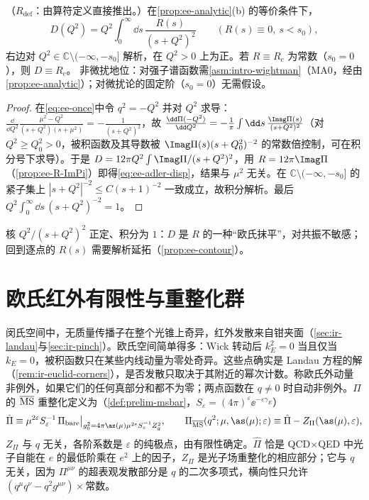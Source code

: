 \begin{proposition}\label{prop:ee-adler-dispersion}
（$R_{\mathrm{def}}$：由算符定义直接推出。）在\cref{prop:ee-analytic}(b) 的等价条件下，
\begin{equation}\label{eq:ee-adler-disp}
D(Q^2)=Q^2\int_0^\infty\!\dd s\,\frac{R(s)}{(s+Q^2)^2}\qquad(R(s)\equiv0,\ s<s_0),
\end{equation}
右边对 $Q^2\in\mathbb C\setminus(-\infty,-s_0]$ 解析，在 $Q^2>0$ 上为正。若 $R\equiv R_c$ 为常数（$s_0=0$），则 $D\equiv R_c$。
非微扰地位：对强子谱函数需\cref{asm:intro-wightman}（MA0，经由\cref{prop:ee-analytic}）；对微扰论的固定阶（$s_0=0$）无需假设。
\end{proposition}
\begin{proof}
在\cref{eq:ee-once}中令 $q^2=-Q^2$ 并对 $Q^2$ 求导：$\frac{\dd}{\dd Q^2}\frac{\mu^2-Q^2}{(s+Q^2)(s+\mu^2)}=-\frac{1}{(s+Q^2)^2}$，故 $\frac{\dd\Pi(-Q^2)}{\dd Q^2}=-\frac1\pi\int\dd s\,\frac{\Imag\Pi(s)}{(s+Q^2)^2}$（对 $Q^2\ge Q_0^2>0$，被积函数及其导数被 $\Imag\Pi(s)(s+Q_0^2)^{-2}$ 的常数倍控制，可在积分号下求导）。于是 $D=12\pi Q^2\int\Imag\Pi/(s+Q^2)^2$，用 $R=12\pi\Imag\Pi$（\cref{prop:ee-R-ImPi}）即得\cref{eq:ee-adler-disp}，结果与 $\mu^2$ 无关。在 $\mathbb C\setminus(-\infty,-s_0]$ 的紧子集上 $|s+Q^2|^{-2}\le C(s+1)^{-2}$ 一致成立，故积分解析。最后 $Q^2\int_0^\infty\dd s\,(s+Q^2)^{-2}=1$。
\end{proof}
核 $Q^2/(s+Q^2)^2$ 正定、积分为 $1$：$D$ 是 $R$ 的一种“欧氏抹平”，对共振不敏感；回到逐点的 $R(s)$ 需要解析延拓（\cref{prop:ee-contour}）。

\section{欧氏红外有限性与重整化群}\label{sec:ee-euclid}

闵氏空间中，无质量传播子在整个光锥上奇异，红外发散来自钳夹面（\cref{sec:ir-landau}与\cref{sec:ir-pinch}）。欧氏空间简单得多：Wick 转动后 $k_E^2=0$ 当且仅当 $k_E=0$，被积函数只在某些内线动量为零处奇异。这些点确实是 Landau 方程的解（\cref{rem:ir-euclid-corners}），是否发散只取决于其附近的幂次计数。称欧氏外动量非例外，如果它们的任何真部分和都不为零；两点函数在 $q\ne0$ 时自动非例外。$\Pi$ 的 $\overline{\rm MS}$ 重整化定义为（\cref{def:prelim-msbar}，$S_\varepsilon=(4\pi)^\varepsilon\ee^{-\varepsilon\gamma_E}$）
\begin{equation}\label{eq:ee-PiMS}
\hat\Pi\equiv\mu^{2\varepsilon}S_\varepsilon^{-1}\,\Pi_{\rm bare}\big|_{g_0^2=4\pi\as(\mu)\mu^{2\varepsilon}S_\varepsilon^{-1}Z_g^2},\qquad
\Pi_{\overline{\rm MS}}(q^2;\mu,\as(\mu);\varepsilon)\equiv\hat\Pi-Z_\Pi(\as(\mu),\varepsilon),
\end{equation}
$Z_\Pi$ 与 $q$ 无关，各阶系数是 $\varepsilon$ 的纯极点，由有限性确定。$\hat\Pi$ 恰是 QCD$\times$QED 中光子自能在 $e$ 的最低阶乘在 $e^2$ 上的因子，$Z_\Pi$ 是光子场重整化的相应部分；它与 $q$ 无关，因为 $\Pi^{\mu\nu}$ 的超表观发散部分是 $q$ 的二次多项式，横向性只允许 $(q^\mu q^\nu-q^2g^{\mu\nu})\times$常数。

